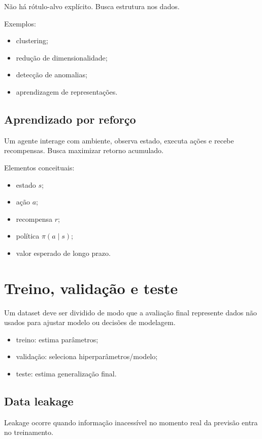 Não há rótulo-alvo explícito. Busca estrutura nos dados.

Exemplos:
\begin{itemize}
\item clustering;
\item redução de dimensionalidade;
\item detecção de anomalias;
\item aprendizagem de representações.
\end{itemize}

\subsection{Aprendizado por reforço}

Um agente interage com ambiente, observa estado, executa ações e recebe recompensas. Busca maximizar retorno acumulado.

Elementos conceituais:
\begin{itemize}
\item estado $s$;
\item ação $a$;
\item recompensa $r$;
\item política $\pi(a\mid s)$;
\item valor esperado de longo prazo.
\end{itemize}

\section{Treino, validação e teste}

Um dataset deve ser dividido de modo que a avaliação final represente dados não usados para ajustar modelo ou decisões de modelagem.

\begin{itemize}
\item treino: estima parâmetros;
\item validação: seleciona hiperparâmetros/modelo;
\item teste: estima generalização final.
\end{itemize}

\subsection{Data leakage}

Leakage ocorre quando informação inacessível no momento real da previsão entra no treinamento.

